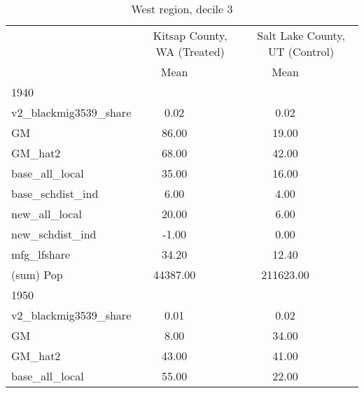 \begin{table}[htbp]\centering
\def\sym#1{\ifmmode^{#1}\else\(^{#1}\)\fi}
\caption{West region, decile 3 \label{tab1}}
\begin{tabular}{l*{2}{ccc}}
\toprule
                    &\multicolumn{3}{c}{Kitsap County, WA (Treated)}&\multicolumn{3}{c}{Salt Lake County, UT (Control)}\\
                    &        Mean&            &            &        Mean&            &            \\
\midrule
1940                &            &            &            &            &            &            \\
v2\_blackmig3539\_share&        0.02&            &            &        0.02&            &            \\
GM                  &       86.00&            &            &       19.00&            &            \\
GM\_hat2             &       68.00&            &            &       42.00&            &            \\
base\_all\_local      &       35.00&            &            &       16.00&            &            \\
base\_schdist\_ind    &        6.00&            &            &        4.00&            &            \\
new\_all\_local       &       20.00&            &            &        6.00&            &            \\
new\_schdist\_ind     &       -1.00&            &            &        0.00&            &            \\
mfg\_lfshare         &       34.20&            &            &       12.40&            &            \\
(sum) Pop           &    44387.00&            &            &   211623.00&            &            \\
\midrule
1950                &            &            &            &            &            &            \\
v2\_blackmig3539\_share&        0.01&            &            &        0.02&            &            \\
GM                  &        8.00&            &            &       34.00&            &            \\
GM\_hat2             &       43.00&            &            &       41.00&            &            \\
base\_all\_local      &       55.00&            &            &       22.00&            &            \\

\end{tabular}
\end{table}
